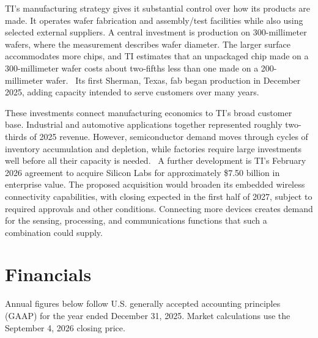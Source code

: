 \documentclass[10pt]{article}
\begin{document}
TI's manufacturing strategy gives it substantial control over how its products are made. It operates wafer fabrication and assembly/test facilities while also using selected external suppliers. A central investment is production on 300-millimeter wafers, where the measurement describes wafer diameter. The larger surface accommodates more chips, and TI estimates that an unpackaged chip made on a 300-millimeter wafer costs about two-fifths less than one made on a 200-millimeter wafer.~\cite{ti-quarterly} Its first Sherman, Texas, fab began production in December 2025, adding capacity intended to serve customers over many years.~\cite{ti-sherman}

These investments connect manufacturing economics to TI's broad customer base. Industrial and automotive applications together represented roughly two-thirds of 2025 revenue. However, semiconductor demand moves through cycles of inventory accumulation and depletion, while factories require large investments well before all their capacity is needed.~\cite{ti-annual} A further development is TI's February 2026 agreement to acquire Silicon Labs for approximately \$7.50 billion in enterprise value. The proposed acquisition would broaden its embedded wireless connectivity capabilities, with closing expected in the first half of 2027, subject to required approvals and other conditions. Connecting more devices creates demand for the sensing, processing, and communications functions that such a combination could supply.~\cite{ti-acquisition}

\newpage
\section*{Financials}

Annual figures below follow U.S. generally accepted accounting principles (GAAP) for the year ended December 31, 2025. Market calculations use the September 4, 2026 closing price.~\cite{ti-annual,ti-price}
\end{document}
